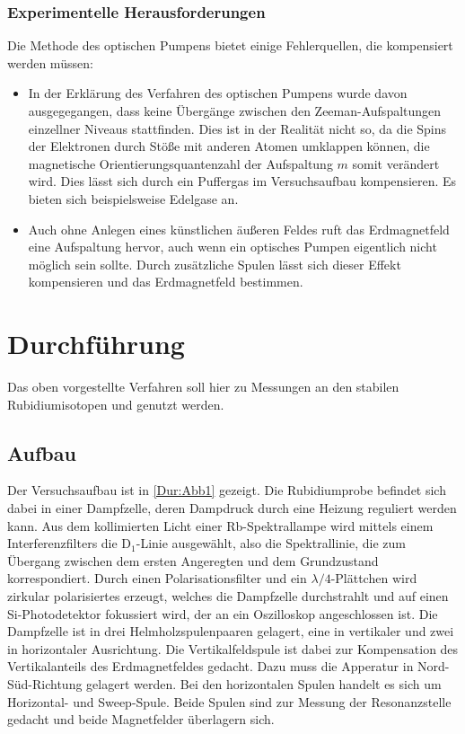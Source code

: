 \subsubsection{Experimentelle Herausforderungen}
Die Methode des optischen Pumpens bietet einige Fehlerquellen, die kompensiert werden
müssen:
\begin{itemize}
  \item In der Erklärung des Verfahren des optischen Pumpens wurde davon ausgegegangen,
  dass keine Übergänge zwischen den Zeeman-Aufspaltungen einzellner Niveaus
  stattfinden.
  Dies ist in der Realität nicht so, da die Spins der Elektronen durch Stöße mit
  anderen Atomen umklappen können, die magnetische Orientierungsquantenzahl der
  Aufspaltung $m$ somit verändert wird.
  Dies lässt sich durch ein Puffergas im Versuchsaufbau kompensieren.
  Es bieten sich beispielsweise Edelgase an.
  \item Auch ohne Anlegen eines künstlichen äußeren
  Feldes ruft das Erdmagnetfeld eine Aufspaltung hervor, auch wenn ein optisches
  Pumpen eigentlich nicht möglich sein sollte.
  Durch zusätzliche Spulen lässt sich dieser Effekt kompensieren und das Erdmagnetfeld
  bestimmen.
\end{itemize}

\section{Durchführung}
Das oben vorgestellte Verfahren soll hier zu Messungen an den stabilen Rubidiumisotopen
 und  genutzt werden.
\subsection{Aufbau}
Der Versuchsaufbau ist in \autoref{Dur:Abb1} gezeigt.
Die Rubidiumprobe befindet sich dabei in einer Dampfzelle, deren Dampdruck durch eine
Heizung reguliert werden kann.
Aus dem kollimierten Licht einer Rb-Spektrallampe wird mittels einem Interferenzfilters die
D$_{1}$-Linie ausgewählt, also die Spektrallinie, die zum Übergang zwischen dem
ersten Angeregten und dem Grundzustand korrespondiert.
Durch einen Polarisationsfilter und ein $\lambda/4$-Plättchen wird zirkular polarisiertes
erzeugt, welches die Dampfzelle durchstrahlt und auf einen Si-Photodetektor
fokussiert wird, der an ein Oszilloskop angeschlossen ist.
Die Dampfzelle ist in drei Helmholzspulenpaaren gelagert, eine in vertikaler und
zwei in horizontaler Ausrichtung.
Die Vertikalfeldspule ist dabei zur Kompensation des Vertikalanteils des Erdmagnetfeldes
gedacht.
Dazu muss die Apperatur in Nord-Süd-Richtung gelagert werden.
Bei den horizontalen Spulen handelt es sich um Horizontal- und Sweep-Spule.
Beide Spulen sind zur Messung der Resonanzstelle gedacht und beide Magnetfelder überlagern
sich.

